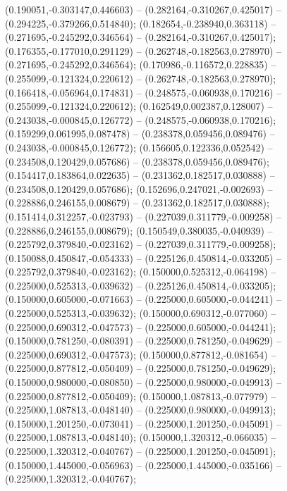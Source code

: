  (0.190051,-0.303147,0.446603) -- (0.282164,-0.310267,0.425017) -- (0.294225,-0.379266,0.514840);
 (0.182654,-0.238940,0.363118) -- (0.271695,-0.245292,0.346564) -- (0.282164,-0.310267,0.425017);
 (0.176355,-0.177010,0.291129) -- (0.262748,-0.182563,0.278970) -- (0.271695,-0.245292,0.346564);
 (0.170986,-0.116572,0.228835) -- (0.255099,-0.121324,0.220612) -- (0.262748,-0.182563,0.278970);
 (0.166418,-0.056964,0.174831) -- (0.248575,-0.060938,0.170216) -- (0.255099,-0.121324,0.220612);
 (0.162549,0.002387,0.128007) -- (0.243038,-0.000845,0.126772) -- (0.248575,-0.060938,0.170216);
 (0.159299,0.061995,0.087478) -- (0.238378,0.059456,0.089476) -- (0.243038,-0.000845,0.126772);
 (0.156605,0.122336,0.052542) -- (0.234508,0.120429,0.057686) -- (0.238378,0.059456,0.089476);
 (0.154417,0.183864,0.022635) -- (0.231362,0.182517,0.030888) -- (0.234508,0.120429,0.057686);
 (0.152696,0.247021,-0.002693) -- (0.228886,0.246155,0.008679) -- (0.231362,0.182517,0.030888);
 (0.151414,0.312257,-0.023793) -- (0.227039,0.311779,-0.009258) -- (0.228886,0.246155,0.008679);
 (0.150549,0.380035,-0.040939) -- (0.225792,0.379840,-0.023162) -- (0.227039,0.311779,-0.009258);
 (0.150088,0.450847,-0.054333) -- (0.225126,0.450814,-0.033205) -- (0.225792,0.379840,-0.023162);
 (0.150000,0.525312,-0.064198) -- (0.225000,0.525313,-0.039632) -- (0.225126,0.450814,-0.033205);
 (0.150000,0.605000,-0.071663) -- (0.225000,0.605000,-0.044241) -- (0.225000,0.525313,-0.039632);
 (0.150000,0.690312,-0.077060) -- (0.225000,0.690312,-0.047573) -- (0.225000,0.605000,-0.044241);
 (0.150000,0.781250,-0.080391) -- (0.225000,0.781250,-0.049629) -- (0.225000,0.690312,-0.047573);
 (0.150000,0.877812,-0.081654) -- (0.225000,0.877812,-0.050409) -- (0.225000,0.781250,-0.049629);
 (0.150000,0.980000,-0.080850) -- (0.225000,0.980000,-0.049913) -- (0.225000,0.877812,-0.050409);
 (0.150000,1.087813,-0.077979) -- (0.225000,1.087813,-0.048140) -- (0.225000,0.980000,-0.049913);
 (0.150000,1.201250,-0.073041) -- (0.225000,1.201250,-0.045091) -- (0.225000,1.087813,-0.048140);
 (0.150000,1.320312,-0.066035) -- (0.225000,1.320312,-0.040767) -- (0.225000,1.201250,-0.045091);
 (0.150000,1.445000,-0.056963) -- (0.225000,1.445000,-0.035166) -- (0.225000,1.320312,-0.040767);
